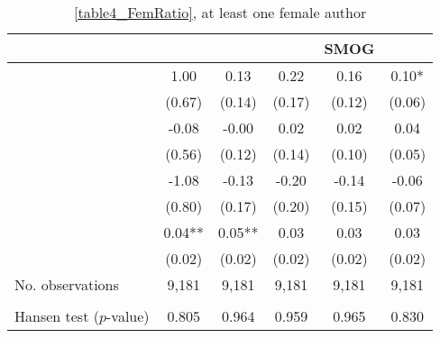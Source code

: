 \begin{table}
    \footnotesize
    \centering
    \begin{threeparttable}
        \caption{\autoref{table4_FemRatio}, at least one female author}
        \label{table4_Fem1}
        \begin{tabular}{p{4cm}S@{}S@{}S@{}S@{}S@{}}
            \toprule
            &{}&{}&{}&{SMOG}&{}\\
            \midrule
            &        1.00   &        0.13   &        0.22   &        0.16   &        0.10*  \\
                                          &      (0.67)   &      (0.14)   &      (0.17)   &      (0.12)   &      (0.06)   \\
            &       -0.08   &       -0.00   &        0.02   &        0.02   &        0.04   \\
                                          &      (0.56)   &      (0.12)   &      (0.14)   &      (0.10)   &      (0.05)   \\
            &       -1.08   &       -0.13   &       -0.20   &       -0.14   &       -0.06   \\
                                          &      (0.80)   &      (0.17)   &      (0.20)   &      (0.15)   &      (0.07)   \\
            &        0.04** &        0.05** &        0.03   &        0.03   &        0.03   \\
                                          &      (0.02)   &      (0.02)   &      (0.02)   &      (0.02)   &      (0.02)   \\
            \midrule
            No. observations     &       9,181   &       9,181   &       9,181   &       9,181   &       9,181   \\
             \\
            \quad Hansen test (\(p\)-value)&       0.805   &       0.964   &       0.959   &       0.965   &       0.830   \\

\end{tabular}
\end{threeparttable}
\end{table}
